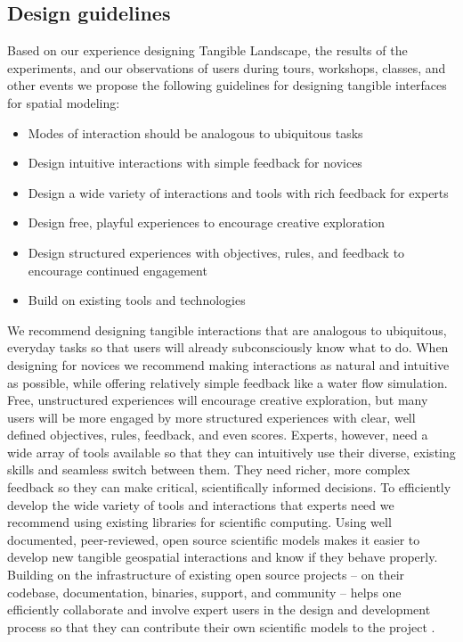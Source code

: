 \documentclass[prodmode,acmtochi]{acmsmall} %
\begin{document}
\subsection{Design guidelines}
Based on our experience designing Tangible Landscape,
the results of the experiments, and 
our observations of users during tours, workshops, classes,
and other events
we propose the following guidelines for
designing tangible interfaces for spatial modeling:

\begin{itemize}
%
\item Modes of interaction should be analogous to ubiquitous tasks
%
\item Design intuitive interactions with simple feedback for novices
%
\item Design a wide variety of interactions and tools 
with rich feedback for experts
%
\item Design free, playful experiences to encourage creative exploration 
%
\item Design structured experiences with objectives, rules, and feedback 
to encourage continued engagement
%
\item Build on existing tools and technologies
%
\end{itemize}

We recommend designing tangible interactions 
that are analogous to ubiquitous, everyday tasks
so that users will already subconsciously know what to do.
When designing for novices
we recommend making 
interactions as natural and intuitive as possible,
while offering relatively simple feedback 
like a water flow simulation.
Free, unstructured experiences will encourage creative exploration,
but many users will be more engaged by more structured experiences
with clear, well defined objectives, rules, feedback, and even scores.  
Experts, however, need a wide array of tools available 
so that they can intuitively use their diverse, existing skills
and seamless switch between them.
They need richer, more complex feedback
so they can make critical, scientifically informed decisions. 
To efficiently develop the wide variety of tools and interactions 
that experts need
we recommend using existing libraries for scientific computing. 
Using well documented, peer-reviewed, open source scientific models 
makes it easier to develop new tangible geospatial interactions
and know if they behave properly. 
Building on the infrastructure of existing open source projects
-- on their codebase, documentation, binaries, support, and community --
helps one efficiently collaborate and involve expert users 
in the design and development process 
so that they can contribute their own scientific models to the project \cite{Petrasova2016}. 
\end{document}
